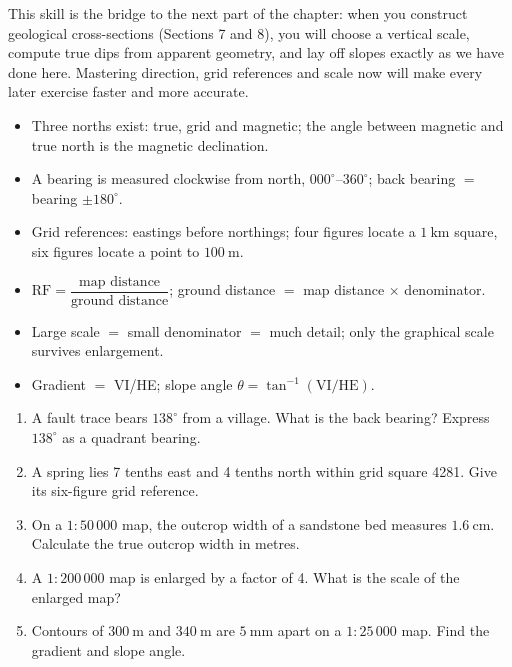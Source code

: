 \documentclass[11pt]{article}
\newcommand{\cle}[1]{{\popxbold\color{popdark}#1}}
\begin{document}
This skill is the bridge to the next part of the chapter: when you construct geological cross-sections (Sections 7 and 8), you will choose a vertical scale, compute true dips from apparent geometry, and lay off slopes exactly as we have done here. Mastering direction, grid references and scale now will make every later exercise faster and more accurate.

\begin{aretenir}
\begin{itemize}
\item Three norths exist: true, grid and magnetic; the angle between magnetic and true north is the \cle{magnetic declination}.
\item A \cle{bearing} is measured clockwise from north, $000^{\circ}$--$360^{\circ}$; back bearing $=$ bearing $\pm 180^{\circ}$.
\item Grid references: \cle{eastings before northings}; four figures locate a $1\ \mathrm{km}$ square, six figures locate a point to $100\ \mathrm{m}$.
\item $\mathrm{RF}=\dfrac{\text{map distance}}{\text{ground distance}}$; ground distance $=$ map distance $\times$ denominator.
\item Large scale $=$ small denominator $=$ much detail; only the \cle{graphical scale} survives enlargement.
\item Gradient $=$ VI/HE; slope angle $\theta=\tan^{-1}(\text{VI}/\text{HE})$.
\end{itemize}
\end{aretenir}

\begin{exercice}[Practice]
\begin{enumerate}
\item A fault trace bears $138^{\circ}$ from a village. What is the back bearing? Express $138^{\circ}$ as a quadrant bearing.
\item A spring lies 7 tenths east and 4 tenths north within grid square 4281. Give its six-figure grid reference.
\item On a $1:50\,000$ map, the outcrop width of a sandstone bed measures $1.6\ \mathrm{cm}$. Calculate the true outcrop width in metres.
\item A $1:200\,000$ map is enlarged by a factor of 4. What is the scale of the enlarged map?
\item Contours of $300\ \mathrm{m}$ and $340\ \mathrm{m}$ are $5\ \mathrm{mm}$ apart on a $1:25\,000$ map. Find the gradient and slope angle.
\end{enumerate}
\end{exercice}
\end{document}
